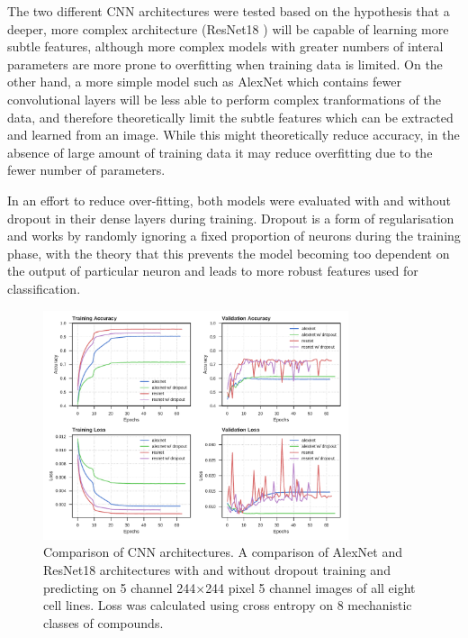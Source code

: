 \documentclass[a4paper,11pt,twoside,openright]{scrbook}
\begin{document}
The two different CNN architectures were tested based on the hypothesis that a deeper, more complex architecture (ResNet18 \cite{He2015}) will be capable of learning more subtle features, although more complex models with greater numbers of interal parameters are more prone to overfitting when training data is limited.
On the other hand, a more simple model such as AlexNet \cite{Krizhevsky2012} which contains fewer convolutional layers will be less able to perform complex tranformations of the data, and therefore theoretically limit the subtle features which can be extracted and learned from an image.
While this might theoretically reduce accuracy, in the absence of large amount of training data it may reduce overfitting due to the fewer number of parameters.

In an effort to reduce over-fitting, both models were evaluated with and without dropout in their dense layers during training.
Dropout is a form of regularisation and works by randomly ignoring a fixed proportion of neurons during the training phase, with the theory that this prevents the model becoming too dependent on the output of particular neuron and leads to more robust features used for classification.

\begin{figure}
    \includegraphics[width=0.8\textwidth]{ch2arch}
    \captionsetup{width=0.8\textwidth}
    \caption[Comparison of CNN architectures]{
Comparison of CNN architectures.
A comparison of AlexNet and ResNet18 architectures with and without dropout training and predicting on 5 channel 244$\times$244 pixel 5 channel images of all eight cell lines.
Loss was calculated using cross entropy on 8 mechanistic classes of compounds.}
    \label{figure:nn_arch}
\end{figure}
\end{document}
